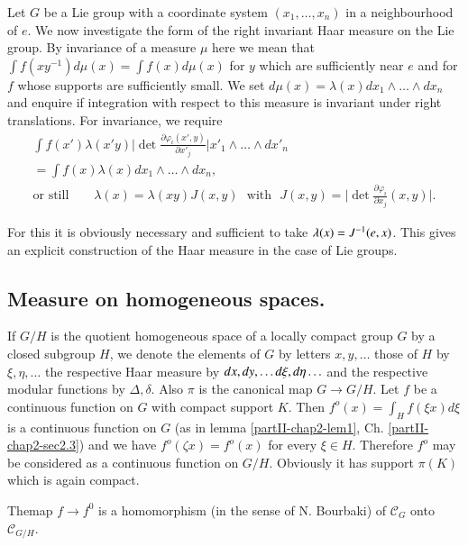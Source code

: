 Let $G$ be a Lie group with a coordinate system $(x_{1},\ldots,x_{n})$
in a neighbourhood of $e$. We now investigate the form of the right
invariant Haar measure on the Lie group. By invariance of a measure
$\mu$ here we mean that $\int f(xy^{-1}) d \mu (x)= \int f(x) d\mu(x)$ for $y$
which are sufficiently near $e$ and for $f$ whose supports are
sufficiently small. We set $d\mu(x)=\lambda (x) dx_1 \wedge
\ldots\wedge dx_n$ and enquire if integration with respect to this
measure is invariant under right translations. For invariance, we
require 
\begin{gather*}
\int f (x') \lambda (x' y) \bigg| \det \frac{\partial \varphi _
  i(x',y)} {\partial x'_j}  \bigg| x'_{1} \wedge \ldots
\wedge dx'_n\\  
=\int f(x) \lambda (x) dx_1 \wedge \ldots\wedge dx_n,\\
\text{or still}\qquad  \lambda(x) = \lambda(xy) J(x,y) \text{~ with~ }
J(x,y) = 
\bigg | \det \frac{\partial \varphi_{i}} {\partial x_j} {(x,y)}\bigg|. 
\end{gather*}

For this it is obviously necessary and sufficient to take
$\lambda(x)=J^{-1}(e,\break x)$. This gives an explicit construction of the
Haar measure in the case of Lie groups. 

\subsection{Measure on homogeneous
  spaces.}\label{partII-chap3-sec3.3}%

If $G/H$ is the quotient homogeneous space of a locally compact group
$G$ by a closed subgroup $H$, we denote the elements of $G$ by letters
$x, y,\ldots$ those of $H$ by $\xi , \eta, \ldots $ the respective
Haar measure by $dx, dy,\ldots d\xi,\break d \eta \ldots $ and the
respective modular functions by $\Delta , \delta$. Also $\pi$ is the
canonical map $G \rightarrow G/H $. Let $f$ be a continuous function
on $G$ with compact support $K$. Then $f^o(x) =\int_H f(\xi x)d \xi$
is a continuous function on $G$ (as in lemma \ref{partII-chap2-lem1},
Ch. \ref{partII-chap2-sec2.3}) and we have
$f^o(\zeta x) = f^o(x)$ for every $\xi \in H$. Therefore $f^o$ may be
considered as a continuous function on $G/H$. Obviously it has support
$\pi(K)$ which is again compact. 

\begin{proposition}\label{partII-chap3-prop2}%
 The\pageoriginale map $f\rightarrow f^0$ is a homomorphism (in the sense of
 N. Bourbaki) of $\mathscr{C}_G$ onto $\mathscr{C}_{G/H}$. 
\end{proposition}

